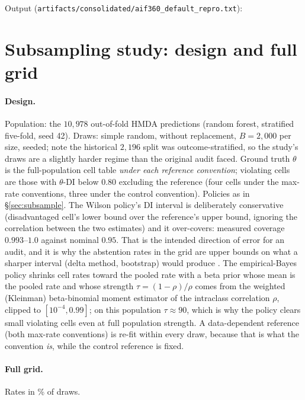\documentclass[sigconf,nonacm]{acmart}
\begin{document}
{\scriptsize}

\noindent Output (\texttt{artifacts/consolidated/aif360\_default\_repro.txt}):

{\scriptsize}

\section{Subsampling study: design and full grid}
\label{app:subsample}

\paragraph{Design.} Population: the $10{,}978$ out-of-fold HMDA predictions
(random forest, stratified five-fold, seed 42). Draws: simple random, without
replacement, $B{=}2{,}000$ per size, seeded; note the historical $2{,}196$
split was outcome-stratified, so the study's draws are a slightly harder
regime than the original audit faced. Ground truth $\theta$ is the
full-population cell table \emph{under each reference convention}; violating
cells are those with $\theta$-DI below $0.80$ excluding the reference (four
cells under the max-rate conventions, three under the control convention).
Policies as in \S\ref{sec:subsample}. The Wilson policy's DI interval is
deliberately conservative (disadvantaged cell's lower bound over the
reference's upper bound, ignoring the correlation between the two estimates)
and it over-covers: measured coverage $0.993$--$1.0$ against nominal
$0.95$. That is the intended direction of error for an audit, and it is why
the abstention rates in the grid are upper bounds on what a sharper interval
(delta method, bootstrap) would produce \citep{chen2018}. The empirical-Bayes
policy shrinks cell rates toward the pooled rate with a beta prior whose mean
is the pooled rate and whose strength $\tau = (1-\rho)/\rho$ comes from the
weighted (Kleinman) beta-binomial moment estimator of the intraclass
correlation $\rho$, clipped to $[10^{-4}, 0.99]$; on this population
$\tau \approx 90$, which is why the policy clears small violating cells even
at full population strength. A data-dependent reference (both max-rate
conventions) is re-fit within every draw, because that is what the convention
\emph{is}, while the control reference is fixed.

\paragraph{Full grid.} Rates in \% of draws.
\end{document}
